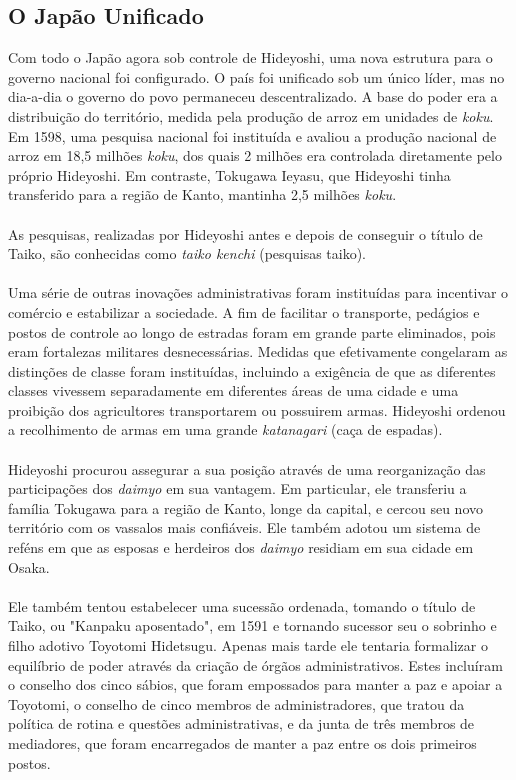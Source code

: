 \documentclass[12pt, a4paper]{article}
\begin{document}
        \subsection {O Japão Unificado}
            Com todo o Japão agora sob controle de Hideyoshi, uma nova estrutura para o governo nacional foi configurado. O país foi unificado sob um único líder, mas no dia-a-dia o governo do povo permaneceu descentralizado. A base do poder era a distribuição do território, medida pela produção de arroz em unidades de \textit{koku}. Em 1598, uma pesquisa nacional foi instituída e avaliou a produção nacional de arroz em 18,5 milhões \textit{koku}, dos quais 2 milhões era controlada diretamente pelo próprio Hideyoshi. Em contraste, Tokugawa Ieyasu, que Hideyoshi tinha transferido para a região de Kanto, mantinha 2,5 milhões \textit{koku}.\\
            \\
            \indent As pesquisas, realizadas por Hideyoshi antes e depois de conseguir o título de Taiko, são conhecidas como \textit{taiko kenchi}  (pesquisas taiko).\\
            \\
            \indent Uma série de outras inovações administrativas foram instituídas para incentivar o comércio e estabilizar a sociedade. A fim de facilitar o transporte, pedágios e postos de controle ao longo de estradas foram em grande parte eliminados, pois eram fortalezas militares desnecessárias. Medidas que efetivamente congelaram as distinções de classe foram instituídas, incluindo a exigência de que as diferentes classes vivessem separadamente em diferentes áreas de uma cidade e uma proibição dos agricultores transportarem ou possuirem armas. Hideyoshi ordenou a recolhimento de armas em uma grande \textit{katanagari} (caça de espadas).\\
            \\
            \indent Hideyoshi procurou assegurar a sua posição através de uma reorganização das participações dos \textit{daimyo} em sua vantagem. Em particular, ele transferiu a família Tokugawa para a região de Kanto, longe da capital, e cercou seu novo território com os vassalos mais confiáveis. Ele também adotou um sistema de reféns em que as esposas e herdeiros dos \textit{daimyo} residiam em sua cidade em Osaka.\\
            \\
            \indent Ele também tentou estabelecer uma sucessão ordenada, tomando o título de Taiko, ou "Kanpaku aposentado", em 1591 e tornando sucessor seu o sobrinho e filho adotivo Toyotomi Hidetsugu. Apenas mais tarde ele tentaria formalizar o equilíbrio de poder através da criação de órgãos administrativos. Estes incluíram o conselho dos cinco sábios, que foram empossados para manter a paz e apoiar a Toyotomi, o conselho de cinco membros de administradores, que tratou da política de rotina e questões administrativas, e da junta de três membros de mediadores, que foram encarregados de manter a paz entre os dois primeiros postos.\\
\end{document}
